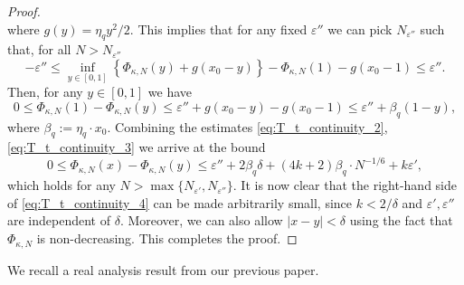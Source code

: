 \documentclass[reqno,11pt]{amsart}
\newcommand{\logq}{\eta_q}
\numberwithin{equation}{section}
\theoremstyle{definition}
\begin{document}
\begin{proof}
\begin{equation*}
    \end{equation*}
    where $g(y)= \logq y^2/2 $.
    This implies that for any fixed $\varepsilon''$ we can pick $N_{\varepsilon''}$ such that, for all $N>N_{\varepsilon''}$
    \begin{equation*}
        -\varepsilon'' \le \inf_{y\in [0,1]} \left\{ \Phi_{\kappa,N}(y) + g(x_0-y) \right\} - \Phi_{\kappa,N}(1) - g(x_0-1) \le \varepsilon''.
    \end{equation*}
    Then, for any $y\in[0,1]$ we have
    \begin{equation}\label{eq:T_t_continuity_3}
        0\le \Phi_{\kappa,N}(1)- \Phi_{\kappa,N}(y) \le \varepsilon'' + g(x_0-y)-g(x_0-1)  \le \varepsilon'' + \beta_q(1-y),
    \end{equation}
    where $\beta_q:=\eta_q\cdot x_0$. Combining the estimates \eqref{eq:T_t_continuity_2}, \eqref{eq:T_t_continuity_3} we arrive at the bound
    \begin{equation} \label{eq:T_t_continuity_4}
       0\le \Phi_{\kappa,N}(x)-\Phi_{\kappa,N}(y) \le \varepsilon'' + 2\beta_q\delta+(4k+2)\beta_q\cdot N^{-1/6} + k \varepsilon',
    \end{equation}
    which holds for any $N>\max\{ N_{\varepsilon'}, N_{\varepsilon''} \}$. It is now clear that the right-hand side of \eqref{eq:T_t_continuity_4} can be made arbitrarily small, since $k<2/\delta$ and $\varepsilon', \varepsilon''$ are independent of $\delta$. Moreover, we can also allow $|x-y|<\delta$ using the fact that $\Phi_{\kappa,N}$ is non-decreasing. This completes the proof. 
\end{proof}


We recall a real analysis result from our previous paper.
\end{document}
